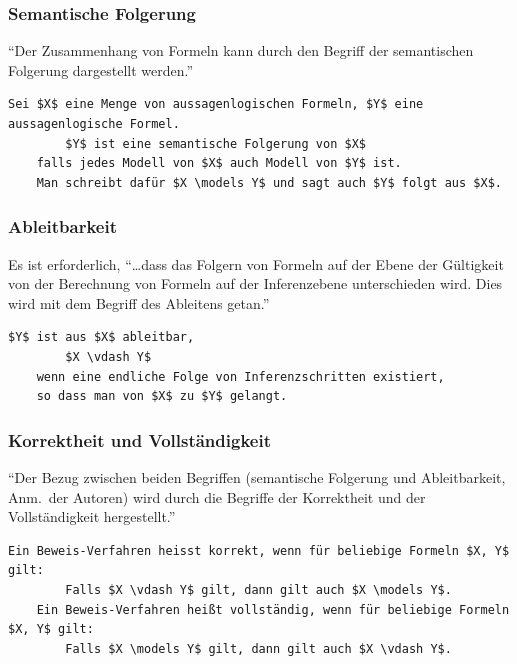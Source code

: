 \subsubsection{Semantische Folgerung}
\label{subsubsection:beschreibungslogik_semfol}
``Der Zusammenhang von Formeln kann durch den Begriff der semantischen Folgerung dargestellt werden.''~\cite[S. 39]{laemmel}

\begin{lstlisting}[caption={Definition semantische Folgerung\protect\footnotemark}]
    Sei $X$ eine Menge von aussagenlogischen Formeln, $Y$ eine aussagenlogische Formel.
        $Y$ ist eine semantische Folgerung von $X$
    falls jedes Modell von $X$ auch Modell von $Y$ ist.
    Man schreibt dafür $X \models Y$ und sagt auch $Y$ folgt aus $X$.
\end{lstlisting}

\subsubsection{Ableitbarkeit}
\label{subsubsection:beschreibungslogik_ableitbarkeit}
Es ist erforderlich, ``\dots dass das Folgern von Formeln auf der Ebene der Gültigkeit von der Berechnung von Formeln auf der Inferenzebene unterschieden wird. Dies wird mit dem Begriff des Ableitens getan.''~\cite[S. 42]{laemmel}

\begin{lstlisting}[caption={Definition Ableitbarkeit\protect\footnotemark}]
    $Y$ ist aus $X$ ableitbar,
        $X \vdash Y$
    wenn eine endliche Folge von Inferenzschritten existiert,
    so dass man von $X$ zu $Y$ gelangt.
\end{lstlisting}

\subsubsection{Korrektheit und Vollständigkeit}
\label{subsubsection:beschreibungslogik_vollstanendigkeit}
``Der Bezug zwischen beiden Begriffen (semantische Folgerung und Ableitbarkeit, Anm.\ der Autoren) wird durch die Begriffe der Korrektheit und der Vollständigkeit hergestellt.''~\cite[S. 43]{laemmel}

\begin{lstlisting}[caption={Definition Korrektheit und Vollständigkeit\protect\footnotemark}]
    Ein Beweis-Verfahren heisst korrekt, wenn für beliebige Formeln $X, Y$ gilt:
        Falls $X \vdash Y$ gilt, dann gilt auch $X \models Y$.
    Ein Beweis-Verfahren heißt vollständig, wenn für beliebige Formeln $X, Y$ gilt:
        Falls $X \models Y$ gilt, dann gilt auch $X \vdash Y$.
\end{lstlisting}


